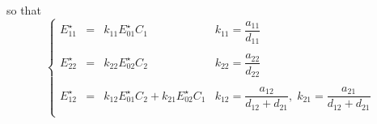 \documentclass[aps,onecolumn,12pt]{revtex4}
\begin{document}
so that
\begin{equation}
\left\lbrace
\begin{array}{rcl|l}
	E_{11}^\star & = & k_{11} E_{01}^\star C_1 & k_{11} = \dfrac{a_{11}}{d_{11}}\\
	 & & & \\
	E_{22}^\star & = & k_{22} E_{02}^\star C_2 & k_{22} = \dfrac{a_{22}}{d_{22}}\\
	 & & & \\
	E_{12}^\star & = & k_{12} E_{01}^\star C_2 + k_{21} E_{02}^\star C_1  & k_{12} = \dfrac{a_{12}}{d_{12}+d_{21}},\; k_{21} = \dfrac{a_{21}}{d_{12}+d_{21}} \\
\end{array}
\right.
\end{equation}
\end{document}
